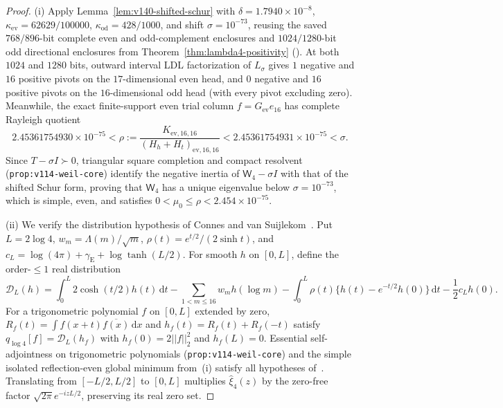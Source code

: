 \documentclass[11pt]{article}
\def\norm#1{||#1||}%
\theoremstyle{remark}
\newcommand{\norm}[1]{\left\lVert #1\right\rVert}
\newcommand{\dd}{\mathrm d}
\begin{document}
\begin{proof}
(i) Apply Lemma~\ref{lem:v140-shifted-schur} with $\delta = 1.7940 \times 10^{-8}$, $\kappa_{\mathrm{ev}} = 62629/100000$, $\kappa_{\mathrm{od}} = 428/1000$, and shift $\sigma = 10^{-73}$, reusing the saved $768/896$-bit complete even and odd-complement enclosures and $1024/1280$-bit odd directional enclosures from Theorem~\ref{thm:lambda4-positivity} (). At both $1024$ and $1280$ bits, outward interval LDL factorization of $L_\sigma$ gives $1$ negative and $16$ positive pivots on the $17$-dimensional even head, and $0$ negative and $16$ positive pivots on the $16$-dimensional odd head (with every pivot excluding zero). Meanwhile, the exact finite-support even trial column $f = G_{\mathrm{ev}} e_{16}$ has complete Rayleigh quotient
\begin{equation}\label{eq:v140-rayleigh-e16}
  2.45361754930 \times 10^{-75} < \rho := \frac{K_{\mathrm{ev},16,16}}{(H_h + H_t)_{\mathrm{ev},16,16}} < 2.45361754931 \times 10^{-75} < \sigma.
\end{equation}
Since $T - \sigma I \succ 0$, triangular square completion and compact resolvent (\texttt{prop:v114-weil-core}) identify the negative inertia of $\mathsf{W}_4 - \sigma I$ with that of the shifted Schur form, proving that $\mathsf{W}_4$ has a unique eigenvalue below $\sigma = 10^{-73}$, which is simple, even, and satisfies $0 < \mu_0 \le \rho < 2.454 \times 10^{-75}$.

(ii) We verify the distribution hypothesis of Connes and van Suijlekom~\cite[Theorem~6.1 and Remark~4.3]{ConnesVanSuijlekom2025}. Put $L = 2\log 4$, $w_m = \Lambda(m)/\sqrt{m}$, $\rho(t) = e^{t/2}/(2\sinh t)$, and $c_L = \log(4\pi) + \gamma_{\mathrm{E}} + \log\tanh(L/2)$. For smooth $h$ on $[0,L]$, define the order-$\le 1$ real distribution
\[
  \mathcal{D}_L(h) = \int_0^L 2\cosh(t/2)h(t)\,\dd t - \sum_{1 < m \le 16} w_m h(\log m) - \int_0^L \rho(t)\bigl\{h(t) - e^{-t/2}h(0)\bigr\}\,\dd t - \frac{1}{2}c_L h(0).
\]
For a trigonometric polynomial $f$ on $[0,L]$ extended by zero, $R_f(t) = \int f(x+t)\overline{f(x)}\,\dd x$ and $h_f(t) = R_f(t) + R_f(-t)$ satisfy $q_{\log 4}[f] = \mathcal{D}_L(h_f)$ with $h_f(0) = 2\norm{f}_2^2$ and $h_f(L) = 0$. Essential self-adjointness on trigonometric polynomials (\texttt{prop:v114-weil-core}) and the simple isolated reflection-even global minimum from~(i) satisfy all hypotheses of~\cite[Theorem~6.1]{ConnesVanSuijlekom2025}. Translating from $[-L/2, L/2]$ to $[0,L]$ multiplies $\widehat{\xi}_4(z)$ by the zero-free factor $\sqrt{2\pi}e^{-izL/2}$, preserving its real zero set.
\end{proof}
\end{document}
